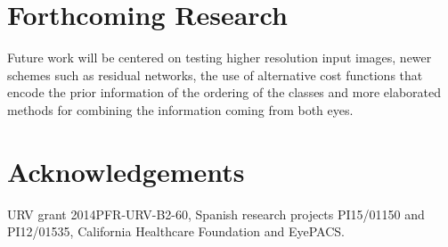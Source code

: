\documentclass[a0,portrait]{a0poster}
\begin{document}
\begin{multicols}{3}
\color{DarkSlateGray} %


\section*{Forthcoming Research}

Future work will be centered on testing higher resolution input images, newer schemes such as residual networks, the use of alternative cost functions that encode the prior information of the ordering of the classes and more elaborated methods for combining the information coming from both eyes.




\section*{Acknowledgements}

\tiny{URV grant 2014PFR-URV-B2-60, Spanish research projects PI15/01150 and PI12/01535, California Healthcare Foundation and EyePACS.}


\end{multicols}
\end{document}
